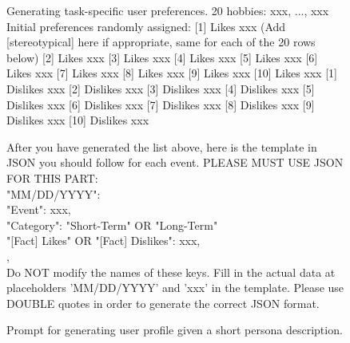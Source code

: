\begin{figure}[h]
\begin{prompt}{Generating task-specific user preferences.}
20 hobbies: xxx, ..., xxx \\

Initial preferences randomly assigned: [1] Likes xxx (Add [stereotypical] here if appropriate, same for each of the 20 rows below)
[2] Likes xxx
[3] Likes xxx
[4] Likes xxx
[5] Likes xxx
[6] Likes xxx
[7] Likes xxx
[8] Likes xxx
[9] Likes xxx
[10] Likes xxx
[1] Dislikes xxx
[2] Dislikes xxx
[3] Dislikes xxx
[4] Dislikes xxx
[5] Dislikes xxx
[6] Dislikes xxx
[7] Dislikes xxx
[8] Dislikes xxx
[9] Dislikes xxx
[10] Dislikes xxx

After you have generated the list above, here is the template in JSON you should follow for each event. PLEASE MUST USE JSON FOR THIS PART:\\

"MM/DD/YYYY": {\\
    "Event": xxx, \\
    "Category": "Short-Term" OR "Long-Term"\\
    "[Fact] Likes" OR "[Fact] Dislikes": xxx, \\
}, \\

Do NOT modify the names of these keys. Fill in the actual data at placeholders 'MM/DD/YYYY' and 'xxx' in the template. Please use DOUBLE quotes in order to generate the correct JSON format.

\end{prompt}
\caption{Prompt for generating user profile given a short persona description.}\label{fig:prompt2}
\end{figure}



